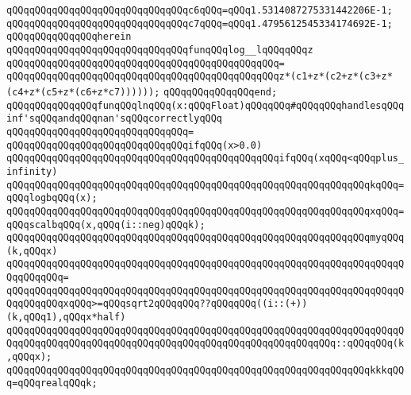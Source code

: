 \verb|qQQqqQQqqQQqqQQqqQQqqQQqqQQqqQQqc6qQQq=qQQq1.5314087275331442206E-1;|\newline
\verb|qQQqqQQqqQQqqQQqqQQqqQQqqQQqqQQqc7qQQq=qQQq1.4795612545334174692E-1;|\newline
\newline
\verb|qQQqqQQqqQQqqQQqherein|\newline
\newline
\verb|qQQqqQQqqQQqqQQqqQQqqQQqqQQqqQQqfunqQQqlog__lqQQqqQQqz|\newline
\verb|qQQqqQQqqQQqqQQqqQQqqQQqqQQqqQQqqQQqqQQqqQQqqQQq=|\newline
\verb|qQQqqQQqqQQqqQQqqQQqqQQqqQQqqQQqqQQqqQQqqQQqqQQqz*(c1+z*(c2+z*(c3+z*(c4+z*(c5+z*(c6+z*c7))))));|\newline
\verb|qQQqqQQqqQQqqQQqend;|\newline
\newline
\verb|qQQqqQQqqQQqqQQqfunqQQqlnqQQq(x:qQQqFloat)qQQqqQQq#qQQqqQQqhandlesqQQqinf'sqQQqandqQQqnan'sqQQqcorrectlyqQQq|\newline
\verb|qQQqqQQqqQQqqQQqqQQqqQQqqQQqqQQq=|\newline
\verb|qQQqqQQqqQQqqQQqqQQqqQQqqQQqqQQqifqQQq(x>0.0)|\newline
\newline
\verb|qQQqqQQqqQQqqQQqqQQqqQQqqQQqqQQqqQQqqQQqqQQqqQQqifqQQq(xqQQq<qQQqplus_infinity)|\newline
\newline
\verb|qQQqqQQqqQQqqQQqqQQqqQQqqQQqqQQqqQQqqQQqqQQqqQQqqQQqqQQqqQQqqQQqkqQQq=qQQqlogbqQQq(x);|\newline
\verb|qQQqqQQqqQQqqQQqqQQqqQQqqQQqqQQqqQQqqQQqqQQqqQQqqQQqqQQqqQQqqQQqxqQQq=qQQqscalbqQQq(x,qQQq(i::neg)qQQqk);|\newline
\newline
\verb|qQQqqQQqqQQqqQQqqQQqqQQqqQQqqQQqqQQqqQQqqQQqqQQqqQQqqQQqqQQqqQQqmyqQQq(k,qQQqx)|\newline
\verb|qQQqqQQqqQQqqQQqqQQqqQQqqQQqqQQqqQQqqQQqqQQqqQQqqQQqqQQqqQQqqQQqqQQqqQQqqQQqqQQq=|\newline
\verb|qQQqqQQqqQQqqQQqqQQqqQQqqQQqqQQqqQQqqQQqqQQqqQQqqQQqqQQqqQQqqQQqqQQqqQQqqQQqqQQqxqQQq>=qQQqsqrt2qQQqqQQq??qQQqqQQq((i::(+))(k,qQQq1),qQQqx*half)|\newline
\verb|qQQqqQQqqQQqqQQqqQQqqQQqqQQqqQQqqQQqqQQqqQQqqQQqqQQqqQQqqQQqqQQqqQQqqQQqqQQqqQQqqQQqqQQqqQQqqQQqqQQqqQQqqQQqqQQqqQQqqQQqqQQqqQQq::qQQqqQQq(k,qQQqx);|\newline
\newline
\verb|qQQqqQQqqQQqqQQqqQQqqQQqqQQqqQQqqQQqqQQqqQQqqQQqqQQqqQQqqQQqqQQqkkkqQQq=qQQqrealqQQqk;|\newline
